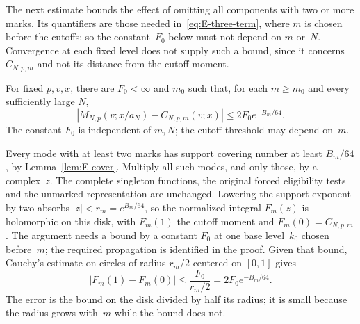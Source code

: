 The next estimate bounds the effect of omitting all components with two or more marks. Its quantifiers are those needed in~\eqref{eq:E-three-term}, where $m$ is chosen before the cutoffs; so the constant~$F_0$ below must not depend on $m$ or~$N$. Convergence at each fixed level does not supply such a bound, since it concerns $C_{N,p,m}$ and not its distance from the cutoff moment.
\begin{lemma}\label{lem:E-stopping}
For fixed $p,v,x$, there are $F_0<\infty$ and $m_0$ such that, for each $m\ge m_0$ and every sufficiently large $N$,
\begin{equation}\label{eq:E-stop-error}
 |M_{N,p}(v;x/a_N)-C_{N,p,m}(v;x)|
 \le2F_0e^{-B_m/64}.
\end{equation}
The constant $F_0$ is independent of $m,N$; the cutoff threshold may depend on~$m$.
\end{lemma}
Every mode with at least two marks has support covering number at least $B_m/64$, by Lemma~\ref{lem:E-cover}. Multiply all such modes, and only those, by a complex~$z$. The complete singleton functions, the original forced eligibility tests and the unmarked representation are unchanged. Lowering the support exponent by two absorbs $|z|<r_m=e^{B_m/64}$, so the normalized integral $F_m(z)$ is holomorphic on this disk, with $F_m(1)$ the cutoff moment and $F_m(0)=C_{N,p,m}$. The argument needs a bound by a constant $F_0$ at one base level~$k_0$ chosen before~$m$; the required propagation is identified in the proof. Given that bound, Cauchy's estimate on circles of radius $r_m/2$ centered on $[0,1]$ gives
\begin{equation*}
 |F_m(1)-F_m(0)|\le\frac{F_0}{r_m/2}=2F_0e^{-B_m/64}.
\end{equation*}
The error is the bound on the disk divided by half its radius; it is small because the radius grows with~$m$ while the bound does not.
